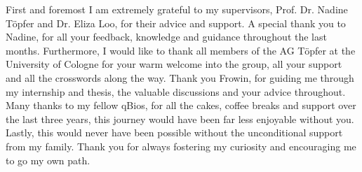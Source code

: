 \begin{center}
	\huge {}
\end{center}

First and foremost I am extremely grateful to my supervisors, Prof. Dr. Nadine Töpfer and Dr. Eliza Loo, for their advice and support. A special thank you to Nadine, for all your feedback, knowledge and guidance throughout the last months. Furthermore, I would like to thank all members of the AG Töpfer at the University of Cologne for your warm welcome into the group, all your support and all the crosswords along the way. Thank you Frowin, for guiding me through my internship and thesis, the valuable discussions and your advice throughout. Many thanks to my fellow qBios, for all the cakes, coffee breaks and support over the last three years, this journey would have been far less enjoyable without you. 
Lastly, this would never have been possible without the unconditional support from my family. Thank you for always fostering my curiosity and encouraging me to go my own path.
